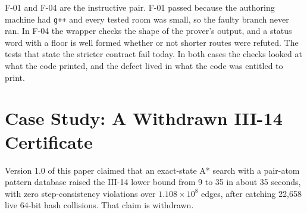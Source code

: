\documentclass[11pt,a4paper]{article}
\begin{document}
F-01 and F-04 are the instructive pair. F-01 passed because the authoring machine had \texttt{g++} and every tested room was small, so the faulty branch never ran. In F-04 the wrapper checks the shape of the prover's output, and a status word with a floor is well formed whether or not shorter routes were refuted. The tests that state the stricter contract fail today. In both cases the checks looked at what the code printed, and the defect lived in what the code was entitled to print.

\section{Case Study: A Withdrawn III-14 Certificate}
\label{sec:iii14}

Version 1.0 of this paper claimed that an exact-state A* search with a pair-atom pattern database raised the III-14 lower bound from 9 to 35 in about 35 seconds, with zero step-consistency violations over $1.108\times 10^{8}$ edges, after catching 22,658 live 64-bit hash collisions. That claim is withdrawn.
\end{document}
